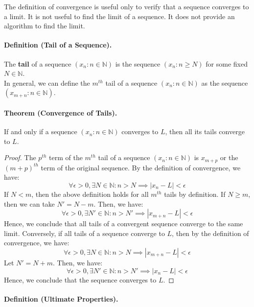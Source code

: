 \documentclass[openany]{book}
\numberwithin{equation}{section}
\begin{document}
    The definition of convergence is useful only to verify that a sequence converges to a limit. It is not useful to find the limit of a sequence. It does not provide an algorithm to find the limit. 
\par
\paragraph{Definition (Tail of a Sequence).}

    The \textbf{tail} of a sequence $(x_n : n \in \mathbb{N})$ is the sequence $(x_n : n \geq N)$ for some fixed $N \in \mathbb{N}$. \\
    In general, we can define the $m^{th}$ tail of a sequence $(x_n : n \in \mathbb{N})$ as the sequence $(x_{m+n} : n \in \mathbb{N})$.
\par
\paragraph{Theorem (Convergence of Tails).}

    If and only if a sequence $(x_n : n \in \mathbb{N})$ converges to $L$, then all its tails converge to $L$. 
\par
\begin{proof}
    The $p^{th}$ term of the $m^{th}$ tail of a sequence $(x_n : n \in \mathbb{N})$ is $x_{m+p}$ or the $(m+p)^{th}$ term of the original sequence. 
    By the definition of convergence, we have:
    $$\forall \epsilon > 0, \exists N \in \mathbb{N}: n > N \implies |x_n - L| < \epsilon$$
    If $N< m$, then the above definition holds for all $m^{th}$ tails by definition. 
    If $N \geq m$, then we can take $N' = N - m$. Then, we have:
    $$\forall \epsilon > 0, \exists N' \in \mathbb{N}: n > N' \implies |x_{m+n} - L| < \epsilon$$
    Hence, we conclude that all tails of a convergent sequence converge to the same limit.
    Conversely, if all tails of a sequence converge to $L$, then by the definition of convergence, we have:
    $$\forall \epsilon > 0, \exists N \in \mathbb{N}: n > N \implies |x_{m+n} - L| < \epsilon$$
    Let $N' = N + m$. Then, we have:
    $$\forall \epsilon > 0, \exists N' \in \mathbb{N}: n > N' \implies |x_n - L| < \epsilon$$
    Hence, we conclude that the sequence converges to $L$.
\end{proof}
\paragraph{Definition (Ultimate Properties).}
\end{document}
